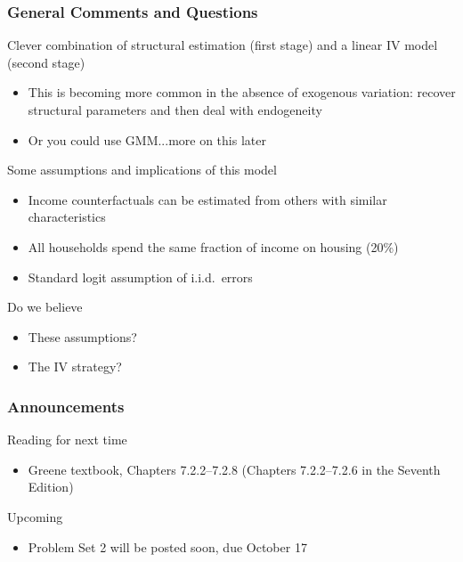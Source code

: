 \documentclass{beamer}
\begin{document}
\begin{frame}\frametitle{General Comments and Questions}
    Clever combination of structural estimation (first stage) and a linear IV model (second stage)
    \begin{itemize}
      \item This is becoming more common in the absence of exogenous variation: recover structural parameters and then deal with endogeneity
      \item Or you could use GMM...more on this later
    \end{itemize}
    \vspace{2ex}
    Some assumptions and implications of this model
    \begin{itemize}
      \item Income counterfactuals can be estimated from others with similar characteristics
      \item All households spend the same fraction of income on housing (20\%)
      \item Standard logit assumption of i.i.d.\ errors
    \end{itemize}
    \vspace{2ex}
    Do we believe
    \begin{itemize}
      \item These assumptions?
      \item The IV strategy?
    \end{itemize}
\end{frame}

\begin{frame}\frametitle{Announcements}
    Reading for next time
    \begin{itemize}
        \item Greene textbook, Chapters 7.2.2--7.2.8 (Chapters 7.2.2--7.2.6 in the Seventh Edition)
    \end{itemize}
    \vspace{3ex}
    Upcoming
    \begin{itemize}
        \item Problem Set 2 will be posted soon, due October 17
    \end{itemize}
\end{frame}
\end{document}
